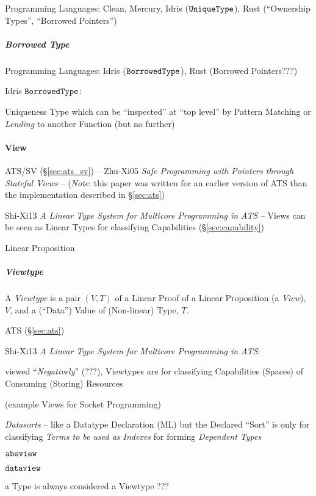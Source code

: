Programming Languages: Clean, Mercury, Idris ($\mathtt{UniqueType}$), Rust
(``Ownership Types'', ``Borrowed Pointers'')



\subparagraph{Borrowed Type}\label{sec:borrowed_type}\hfill

Programming Languages: Idris ($\mathtt{BorrowedType}$), Rust (Borrowed
Pointers???)

Idris $\mathtt{BorrowedType}$:

Uniqueness Type which can be ``inspected'' at ``top level'' by Pattern
Matching or \emph{Lending} to another Function (but no further)



\paragraph{View}\label{sec:view}\hfill

ATS/SV (\S\ref{sec:ats_sv}) -- Zhu-Xi05 \emph{Safe Programming with
  Pointers through Stateful Views} -- (\emph{Note}: this paper was
written for an earlier version of ATS than the implementation
described in \S\ref{sec:ats})

Shi-Xi13 \emph{A Linear Type System for Multicore Programming in ATS}
-- Views can be seen as Linear Types for classifying Capabilities
(\S\ref{sec:capability})

Linear Proposition



\subparagraph{Viewtype}\label{sec:viewtype}\hfill

A \emph{Viewtype} is a pair $(V,T)$ of a Linear Proof of a Linear
Proposition (a \emph{View}), $V$, and a (``Data'') Value of
(Non-linear) Type, $T$.

ATS (\S\ref{sec:ats})

Shi-Xi13 \emph{A Linear Type System for Multicore Programming in ATS}:

viewed ``\emph{Negatively}'' (???), Viewtypes are for classifying
Capabilities (Spaces) of Consuming (Storing) Resources %

(example Views for Socket Programming) %

\emph{Datasorts} -- like a Datatype Declaration (ML) but the Declared
``Sort'' is only for classifying \emph{Terms to be used as Indexes}
for forming \emph{Dependent Types}

$\mathtt{absview}$

$\mathtt{dataview}$

a Type is always considered a Viewtype ??? %

